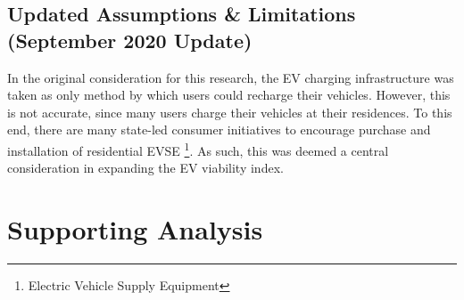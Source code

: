 \documentclass[answers]{exam}
\begin{document}
\subsection{Updated Assumptions \& Limitations (September 2020 Update)}

In the original consideration for this research, the EV charging infrastructure was taken as only method by which users could recharge their vehicles. However, this is not accurate, since many users charge their vehicles at their residences. To this end, there are many state-led consumer initiatives to encourage purchase and installation of residential EVSE \footnote{Electric Vehicle Supply Equipment}. As such, this was deemed a central consideration in expanding the EV viability index. 




\section{Supporting Analysis}
\end{document}

